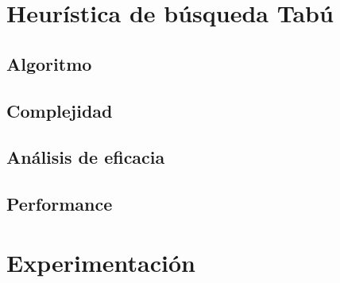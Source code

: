 \documentclass[a4paper, 10pt, twoside]{article}
\begin{document}
\newpage

\section{Heurística de búsqueda Tabú}
\subsection{Algoritmo}
\subsection{Complejidad}
\subsection{Análisis de eficacia}
\subsection{Performance}



\newpage

\section{Experimentación}
\end{document}
